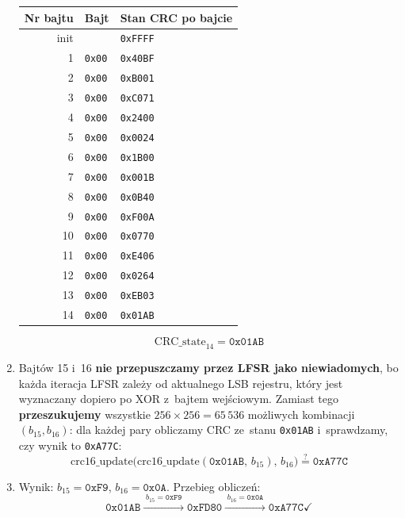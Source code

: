 \documentclass[12pt,a4paper]{article}
\begin{document}
\begin{enumerate}[label=\arabic*.]
        \begin{center}
        \small
        \begin{tabular}{rll}
        \toprule
        \textbf{Nr bajtu} & \textbf{Bajt} & \textbf{Stan CRC po bajcie} \\
        \midrule
        init & & \texttt{0xFFFF} \\
        1  & \texttt{0x00} & \texttt{0x40BF} \\
        2  & \texttt{0x00} & \texttt{0xB001} \\
        3  & \texttt{0x00} & \texttt{0xC071} \\
        4  & \texttt{0x00} & \texttt{0x2400} \\
        5  & \texttt{0x00} & \texttt{0x0024} \\
        6  & \texttt{0x00} & \texttt{0x1B00} \\
        7  & \texttt{0x00} & \texttt{0x001B} \\
        8  & \texttt{0x00} & \texttt{0x0B40} \\
        9  & \texttt{0x00} & \texttt{0xF00A} \\
        10 & \texttt{0x00} & \texttt{0x0770} \\
        11 & \texttt{0x00} & \texttt{0xE406} \\
        12 & \texttt{0x00} & \texttt{0x0264} \\
        13 & \texttt{0x00} & \texttt{0xEB03} \\
        14 & \texttt{0x00} & \texttt{0x01AB} \\
        \bottomrule
        \end{tabular}
        \end{center}
        \[
          \mathrm{CRC\_state}_{14} = \texttt{0x01AB}
        \]
  \item Bajtów 15 i~16 \textbf{nie przepuszczamy przez LFSR jako niewiadomych},
        bo każda iteracja LFSR zależy od aktualnego LSB rejestru, który jest
        wyznaczany dopiero po XOR z~bajtem wejściowym. Zamiast tego
        \textbf{przeszukujemy} wszystkie $256 \times 256 = 65\,536$ możliwych
        kombinacji $(b_{15}, b_{16})$: dla każdej pary obliczamy CRC ze~stanu
        \texttt{0x01AB} i~sprawdzamy, czy wynik to \texttt{0xA77C}:
        \[
          \mathrm{crc16\_update}\bigl(\mathrm{crc16\_update}(\texttt{0x01AB},\,b_{15}),\,b_{16}\bigr)
          \stackrel{?}{=} \texttt{0xA77C}
        \]
  \item Wynik: $b_{15} = \texttt{0xF9}$, $b_{16} = \texttt{0x0A}$.
        Przebieg obliczeń:
        \[
          \texttt{0x01AB}
          \xrightarrow{\;b_{15}=\texttt{0xF9}\;}
          \texttt{0xFD80}
          \xrightarrow{\;b_{16}=\texttt{0x0A}\;}
          \texttt{0xA77C} \checkmark
        \]
\end{enumerate}
\end{document}

